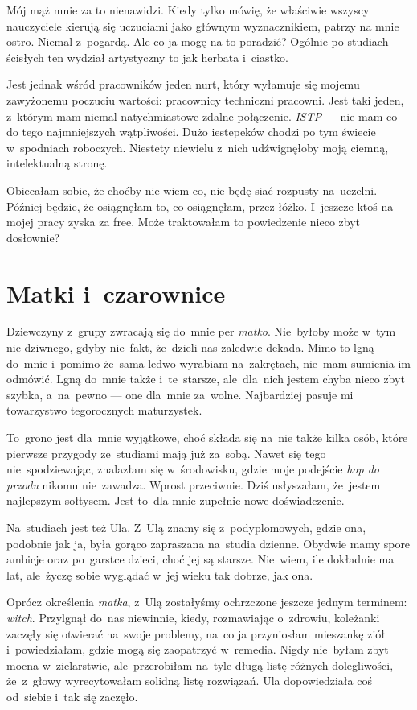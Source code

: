 \documentclass[9pt, a5paper]{memoir}
\begin{document}
Mój mąż mnie za to nienawidzi. Kiedy tylko mówię, że właściwie wszyscy nauczyciele kierują się uczuciami jako głównym wyznacznikiem, patrzy na mnie ostro. Niemal z~pogardą. Ale co ja mogę na to poradzić? Ogólnie po studiach ścisłych ten wydział artystyczny to jak herbata i~ciastko.

Jest jednak wśród pracowników jeden nurt, który wyłamuje się mojemu zawyżonemu poczuciu wartości: pracownicy techniczni pracowni. Jest taki jeden, z~którym mam niemal natychmiastowe zdalne połączenie. \textit{ISTP} --- nie mam co do tego najmniejszych wątpliwości. Dużo iestepeków chodzi po tym świecie w~spodniach roboczych. Niestety niewielu z~nich udźwignęłoby moją ciemną, intelektualną stronę.

Obiecałam sobie, że choćby nie wiem co, nie będę siać rozpusty na~uczelni. Później będzie, że osiągnęłam to, co osiągnęłam, przez łóżko. I~jeszcze ktoś na mojej pracy zyska za free. Może traktowałam to powiedzenie nieco zbyt dosłownie?
\newpage
\section{Matki i~czarownice}
Dziewczyny z~grupy zwracają się do~mnie per \textit{matko}. Nie~byłoby może w~tym nic dziwnego, gdyby nie~fakt, że~dzieli nas zaledwie dekada. Mimo to lgną do~mnie i~pomimo że~sama ledwo wyrabiam na~zakrętach, nie~mam sumienia im odmówić. Lgną do~mnie także i~te~starsze, ale~dla~nich jestem chyba nieco zbyt szybka, a~na~pewno --- one dla~mnie za~wolne. Najbardziej pasuje mi towarzystwo tegorocznych maturzystek.

To~grono jest dla~mnie wyjątkowe, choć składa się na~nie także kilka osób, które pierwsze przygody ze~studiami mają już za~sobą. Nawet się tego nie~spodziewając, znalazłam się w~środowisku, gdzie moje podejście \textit{hop do przodu} nikomu nie~zawadza. Wprost przeciwnie. Dziś usłyszałam, że~jestem najlepszym sołtysem. Jest to~dla mnie zupełnie nowe doświadczenie.

Na~studiach jest też Ula. Z~Ulą znamy się z~podyplomowych, gdzie ona, podobnie jak ja, była gorąco zapraszana na~studia dzienne. Obydwie mamy spore ambicje oraz po~garstce dzieci, choć jej są starsze. Nie~wiem, ile dokładnie ma lat, ale~życzę sobie wyglądać w~jej wieku tak dobrze, jak ona.

Oprócz określenia \textit{matka}, z~Ulą zostałyśmy ochrzczone jeszcze jednym terminem: \textit{witch}. Przylgnął do~nas niewinnie, kiedy, rozmawiając o~zdrowiu, koleżanki zaczęły się otwierać na~swoje problemy, na~co ja przyniosłam mieszankę ziół i~powiedziałam, gdzie mogą się zaopatrzyć w~remedia. Nigdy nie~byłam zbyt mocna w~zielarstwie, ale~przerobiłam na~tyle długą listę różnych dolegliwości, że~z~głowy wyrecytowałam solidną listę rozwiązań. Ula dopowiedziała coś od~siebie i~tak się zaczęło.
\end{document}
